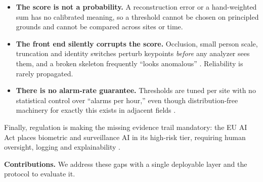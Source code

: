 \documentclass[conference]{IEEEtran}
\begin{document}
\begin{itemize}
\item \textbf{The score is not a probability.} A reconstruction error or a
hand-weighted sum has no calibrated meaning, so a threshold cannot be chosen
on principled grounds and cannot be compared across sites or time.
\item \textbf{The front end silently corrupts the score.} Occlusion, small
person scale, truncation and identity switches perturb keypoints \emph{before}
any analyzer sees them, and a broken skeleton frequently ``looks anomalous''
\cite{poseChallenges2023,bboxtraj2026}. Reliability is rarely propagated.
\item \textbf{There is no alarm-rate guarantee.} Thresholds are tuned per site
with no statistical control over ``alarms per hour,'' even though
distribution-free machinery for exactly this exists in adjacent fields
\cite{angelopoulos2021ltt,bates2021rcps,seizurercps2023,conformalcps2026}.
\end{itemize}

Finally, regulation is making the missing evidence trail mandatory: the EU AI
Act places biometric and surveillance AI in its high-risk tier, requiring
human oversight, logging and explainability \cite{euaiact2024}.

\medskip\noindent\textbf{Contributions.} We address these gaps with a single
deployable layer and the protocol to evaluate it.
\end{document}
